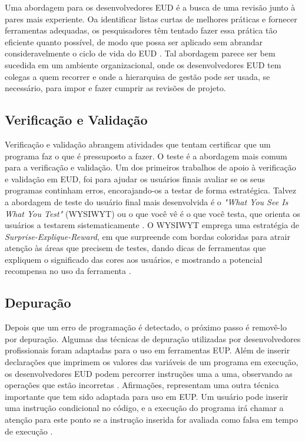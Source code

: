 Uma abordagem para os desenvolvedores EUD é a busca de uma revisão junto à pares mais experiente. Oa identificar listas curtas de melhores práticas e fornecer ferramentas adequadas, os pesquisadores têm tentado fazer essa prática tão eficiente quanto possível, de modo que possa ser aplicado sem abrandar consideravelmente o ciclo de vida do EUD \cite{powell2008management,rosson2013end}. Tal abordagem parece ser bem sucedida em um ambiente organizacional, onde os desenvolvedores EUD tem colegas a quem recorrer e onde a hierarquisa de gestão pode ser usada, se necessário, para impor e fazer cumprir as revisões de projeto.

\subsection{Verificação e Validação}

Verificação e validação abrangem atividades que tentam certificar que um programa faz o que é pressuposto a fazer. O teste é a abordagem mais comum para a verificação e validação. Um dos primeiros trabalhos de apoio à verificação e validação em EUD, foi para ajudar os usuários finais avaliar se os seus programas continham erros, encorajando-os a testar de forma estratégica. Talvez a abordagem de teste do usuário final mais desenvolvida é o \textit{"What You See Is What You Test"} (WYSIWYT) ou o que você vê é o que você testa, que orienta os usuários a testarem sistematicamente \cite{fisher2006integrating}. O WYSIWYT emprega uma estratégia de \textit{Surprise-Explique-Reward}, em que surpreende com bordas coloridas para atrair atenção às áreas que precisem de testes, dando dicas de ferramentas que expliquem o significado das cores aos usuários, e mostrando a potencial recompensa no uso da ferramenta \cite{wilson2003harnessing}.

\subsection{Depuração}

Depois que um erro de programação é detectado, o próximo passo é removê-lo por depuração. Algumas das técnicas de depuração utilizadas por desenvolvedores profissionais foram adaptadas para o uso em ferramentas EUP. Além de inserir declarações que imprimem os valores das variáveis de um programa em execução, os desenvolvedores EUD podem percorrer instruções uma a uma, observando as operações que estão incorretas \cite{leshed2008coscripter}. Afirmações, representam uma outra técnica importante que tem sido adaptada para uso em EUP. Um usuário pode inserir uma instrução condicional no código, e a execução do programa irá chamar a atenção para este ponto se a instrução inserida for avaliada como falsa em tempo de execução \cite{burnett10,koesnandar2008using,scaffidi2008topes}.

